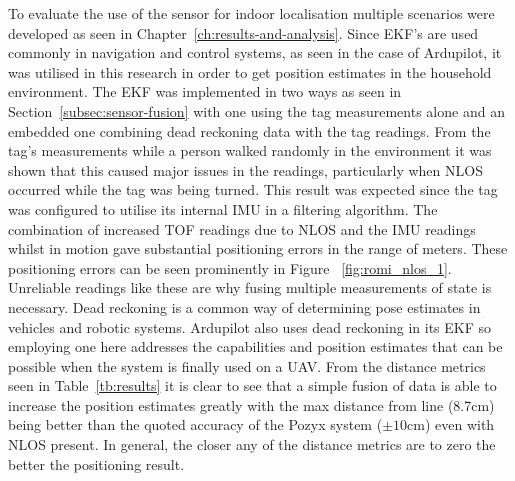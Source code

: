 To evaluate the use of the sensor for indoor localisation multiple scenarios were developed as seen in Chapter~\ref{ch:results-and-analysis}.
Since EKF's are used commonly in navigation and control systems, as seen in the case of Ardupilot, it was utilised in this research in order to get position estimates in the household environment.
The EKF was implemented in two ways as seen in Section~\ref{subsec:sensor-fusion} with one using the tag measurements alone and an embedded one combining dead reckoning data with the tag readings.
From the tag's measurements while a person walked randomly in the environment it was shown that this caused major issues in the readings, particularly when NLOS occurred while the tag was being turned.
This result was expected since the tag was configured to utilise its internal IMU in a filtering algorithm.
The combination of increased TOF readings due to NLOS and the IMU readings whilst in motion gave substantial positioning errors in the range of meters.
These positioning errors can be seen prominently in Figure ~\ref{fig:romi_nlos_1}.
Unreliable readings like these are why fusing multiple measurements of state is necessary.
Dead reckoning is a common way of determining pose estimates in vehicles and robotic systems.
Ardupilot also uses dead reckoning in its EKF so employing one here addresses the capabilities and position estimates that can be possible when the system is finally used on a UAV.
From the distance metrics seen in Table~\ref{tb:results} it is clear to see that a simple fusion of data is able to increase the position estimates greatly with the max distance from line (8.7cm) being better than the quoted accuracy of the Pozyx system ($\pm10$cm) even with NLOS present.
In general, the closer any of the distance metrics are to zero the better the positioning result.

